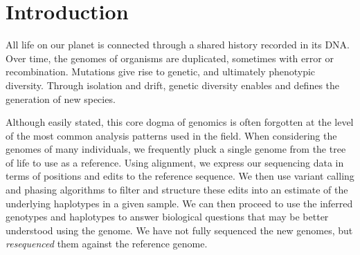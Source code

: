 
\chapter{Introduction}  %

\ifpdf
    \graphicspath{{Chapter1/Figs/Raster/}{Chapter1/Figs/PDF/}{Chapter1/Figs/}}
\else
    \graphicspath{{Chapter1/Figs/Vector/}{Chapter1/Figs/}}
\fi


All life on our planet is connected through a shared history recorded in its DNA.
Over time, the genomes of organisms are duplicated, sometimes with error or recombination.
Mutations give rise to genetic, and ultimately phenotypic diversity.
Through isolation and drift, genetic diversity enables and defines the generation of new species.

Although easily stated, this core dogma of genomics is often forgotten at the level of the most common analysis patterns used in the field.
When considering the genomes of many individuals, we frequently pluck a single genome from the tree of life to use as a reference.
Using alignment, we express our sequencing data in terms of positions and edits to the reference sequence.
We then use variant calling and phasing algorithms to filter and structure these edits into an estimate of the underlying haplotypes in a given sample.
We can then proceed to use the inferred genotypes and haplotypes to answer biological questions that may be better understood using the genome.
We have not fully sequenced the new genomes, but \emph{resequenced} them against the reference genome.

